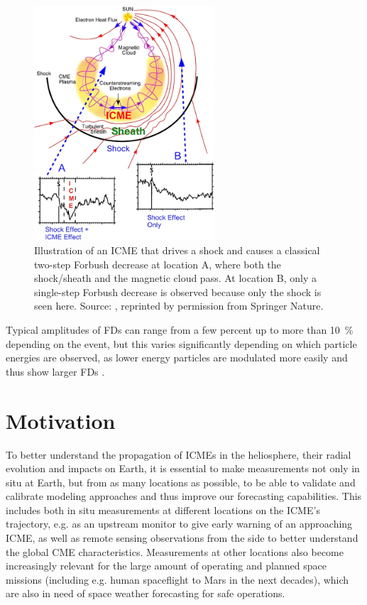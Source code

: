 \begin{figure}
	\centering
	\includegraphics[width=0.6\textwidth]{images/richardson_cane_2011_icme.png}
	\caption{Illustration of an ICME that drives a shock and causes a classical two-step Forbush decrease at location A, where both the shock/sheath and the magnetic cloud pass. At location B, only a single-step Forbush decrease is observed because only the shock is seen here. Source: \citet[Figure 1]{Richardson-Cane-2011}, reprinted by permission from Springer Nature.}
	\label{fig:richardsoncane-cme}
\end{figure}
Typical amplitudes of \acp{FD} can range from a few percent up to more than \SI{10}{\percent} depending on the event, but this varies significantly depending on which particle energies are observed, as lower energy particles are modulated more easily and thus show larger \acp{FD} \citep{Lockwood1971,Lockwood1991}.


\section{Motivation}

To better understand the propagation of \acp{ICME} in the heliosphere, their radial evolution and impacts on Earth, it is essential to make measurements not only in situ at Earth, but from as many locations as possible, to be able to validate and calibrate modeling approaches and thus improve our forecasting capabilities. This includes both in situ measurements at different locations on the \ac{ICME}'s trajectory, e.g. as an upstream monitor to give early warning of an approaching \ac{ICME}, as well as remote sensing observations from the side to better understand the global \ac{CME} characteristics. Measurements at other locations also become increasingly relevant for the large amount of operating and planned space missions (including e.g. human spaceflight to Mars in the next decades), which are also in need of space weather forecasting for safe operations.

